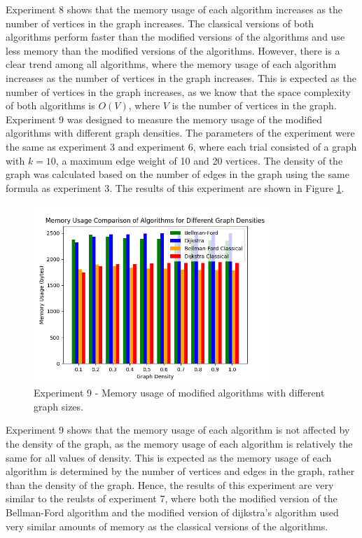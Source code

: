 \documentclass[12pt]{article}
\begin{document}
Experiment 8 shows that the memory usage of each algorithm increases as the number of vertices
in the graph increases. The classical versions of both algorithms perform faster than the modified
versions of the algorithms and use less memory than the modified versions of the algorithms. 
However, there is a clear trend among all algorithms, where the memory usage of each algorithm
increases as the number of vertices in the graph increases. This is expected as the number of vertices in the graph increases, as we know that the space complexity of both algorithms is $O(V)$, where $V$ is the number of vertices in the graph.
\smallskip
\newline
\indent
Experiment 9 was designed to measure the memory usage of the modified algorithms with different graph densities. 
The parameters of the experiment were the same as experiment 3 and experiment 6, where each trial consisted of a graph with $k=10$, a maximum edge weight of 10 and 20 vertices. The density of the graph was calculated based on the number of edges in the graph using the same formula as experiment 3.
The results of this experiment are shown in Figure \ref{fig:Figure 9}.

\begin{figure}[H] 
    \centering
    \includegraphics[width=0.8\textwidth]{Figures/Memory_densities.png} 
    \caption{\footnotesize Experiment 9 - Memory usage of modified algorithms with different graph sizes.}
    \label{fig:Figure 9} 
\end{figure}

Experiment 9 shows that the memory usage of each algorithm is not affected by the density of the graph, as the memory usage of each algorithm is relatively the same for all values of density.
This is expected as the memory usage of each algorithm is determined by the number of vertices and edges in the graph, rather than the density of the graph.
Hence, the results of this experiment are very similar to the reulsts of experiment 7, where both the modified version of the Bellman-Ford algorithm and the modified version of dijkstra's algorithm used very similar amounts of memory as the classical versions of the algorithms.
\end{document}
